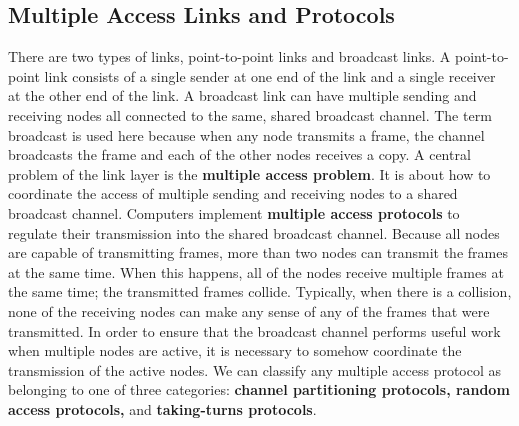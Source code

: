 \subsection{Multiple Access Links and Protocols}
There are two types of links, point-to-point links and broadcast links. A point-to-point link consists of a single sender at one end of the link and a single receiver at the other end of the link. A broadcast link can have multiple sending and receiving nodes all connected to the same, shared broadcast channel. The term broadcast is used here because when any node transmits a frame, the channel broadcasts the frame and each of the other nodes receives a copy. A central problem of the link layer is the \textbf{multiple access problem}. It is about how to coordinate the access of multiple sending and receiving nodes to a shared broadcast channel. Computers implement \textbf{multiple access protocols} to regulate their transmission into the shared broadcast channel. Because all nodes are capable of transmitting frames, more than two nodes can transmit the frames at the same time. When this happens, all of the nodes receive multiple frames at the same time; the transmitted frames collide. Typically, when there is a collision, none of the receiving nodes can make any sense of any of the frames that were transmitted. In order to ensure that the broadcast channel performs useful work when multiple nodes are active, it is necessary to somehow coordinate the transmission of the active nodes. We can classify any multiple access protocol as belonging to one of three categories: \textbf{channel partitioning protocols, random access protocols,} and \textbf{taking-turns protocols}.

